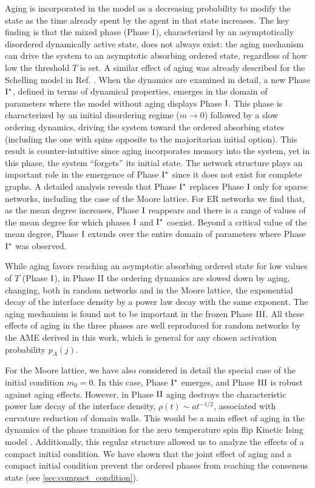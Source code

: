 Aging is incorporated in the model as a decreasing probability to modify the state as the time already spent by the agent in that state increases. The key finding is that the mixed phase (Phase ${\rm I}$), characterized by an asymptotically disordered dynamically active state, does not always exist: the aging mechanism can drive the system to an asymptotic absorbing ordered state, regardless of how low the threshold $T$ is set. A similar effect of aging was already described for the Schelling model in Ref. \cite{Abella-2022}. When the dynamics are examined in detail, a new Phase ${\rm I}^{*}$, defined in terms of dynamical properties, emerges in the domain of parameters where the model without aging displays Phase ${\rm I}$. This phase is characterized by an initial disordering regime ($m \to 0$) followed by a slow ordering dynamics, driving the system toward the ordered absorbing states (including the one with spins opposite to the majoritarian initial option). This result is counter-intuitive since aging incorporates memory into the system, yet in this phase, the system ``forgets'' its initial state. The network structure plays an important role in the emergence of Phase ${\rm I}^{*}$ since it does not exist for complete graphs. A detailed analysis reveals that Phase ${\rm I}^{*}$ replaces Phase ${\rm I}$ only for sparse networks, including the case of the Moore lattice. For ER networks we find that, as the mean degree increases, Phase ${\rm I}$ reappears and there is a range of values of the mean degree for which phases ${\rm I}$ and ${\rm I}^{*}$ coexist. Beyond a critical value of the mean degree, Phase ${\rm I}$ extends over the entire domain of parameters where Phase ${\rm I}^{*}$ was observed.

While aging favors reaching an asymptotic absorbing ordered state for low values of $T$ (Phase ${\rm I}$), in Phase II the ordering dynamics are slowed down by aging, changing, both in random networks and in the Moore lattice, the exponential decay of the interface density by a power law decay with the same exponent. The aging mechanism is found not to be important in the frozen Phase ${\rm III}$. All these effects of aging in the three phases are well reproduced for random networks by the AME derived in this work, which is general for any chosen activation probability $p_A (j)$.

For the Moore lattice, we have also considered in detail the special case of the initial condition $m_0=0$. In this case, Phase ${\rm I}^{*}$ emerges, and Phase ${\rm III}$ is robust against aging effects. However, in Phase ${\rm II}$ aging destroys the characteristic power law decay of the interface density, $\rho(t) \sim at^{-1/2}$, associated with curvature reduction of domain walls. This would be a main effect of aging in the dynamics of the phase transition for the zero temperature spin flip Kinetic Ising model \cite{gunton1983}. Additionally, this regular structure allowed us to analyze the effects of a compact initial condition. We have shown that the joint effect of aging and a compact initial condition prevent the ordered phases from reaching the consensus state (see \ref{sec:compact_condition}).

